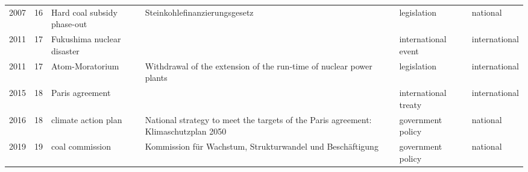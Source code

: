 \begin{longtable}{rrL{3cm}L{5cm}lL{3cm}}
 2007 &                    16 &                             Hard coal subsidy phase-out &                                                        Steinkohlefinanzierungsgesetz &           legislation &       national \\
 2011 &                    17 &                              Fukushima nuclear disaster &                                                                                      &   international event &  international \\
 2011 &                    17 &                                         Atom-Moratorium &                 Withdrawal of  the extension of the run-time of nuclear power plants &           legislation &  international \\
 2015 &                    18 &                                         Paris agreement &                                                                                      &  international treaty &  international \\
 2016 &                    18 &                                     climate action plan &   National strategy to meet the targets of the Paris agreement: Klimaschutzplan 2050 &     government policy &       national \\
 2019 &                    19 &                                         coal commission &                            Kommission für Wachstum, Strukturwandel und Beschäftigung &     government policy &       national \\
\end{longtable}
